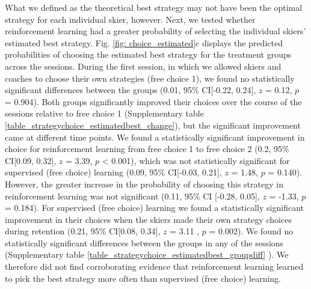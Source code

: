 \documentclass[pdflatex,sn-mathphys-num]{sn-jnl}%
\theoremstyle{thmstyleone}%
\theoremstyle{thmstyletwo}%
\theoremstyle{thmstylethree}%
\begin{document}
What we defined as the theoretical best strategy may not have been the optimal strategy for each individual skier, however. Next, we tested whether reinforcement learning had a greater probability of selecting the individual skiers' estimated best strategy.  Fig. \ref{fig: choice_estimated}c displays the predicted probabilities of choosing the estimated best strategy for the treatment groups across the sessions. During the first session, in which we allowed skiers and coaches to choose their own strategies (free choice 1),  we found no statistically significant differences between the groups (0.01, 95\% CI[-0.22, 0.24], $z$ = 0.12, $p$ = 0.904). Both groups significantly improved their choices over the course of the sessions relative to free choice 1 (Supplementary table \ref{table_strategychoice_estimatedbest_change}), but the significant improvement came at different time points. We found a statistically significant improvement in choice for reinforcement learning from free choice 1 to free choice 2 (0.2, 95\% CI[0.09, 0.32], $z$ = 3.39, $p$ < 0.001), which was not statistically significant for supervised (free choice) learning (0.09, 95\% CI[-0.03, 0.21], $z$ = 1.48, $p$ = 0.140). However, the greater increase in the probability of choosing this strategy in reinforcement learning was not significant (0.11, 95\% CI [-0.28, 0.05], $z$ = -1.33, $p$ = 0.184). For supervised (free choice) learning we found a statistically significant improvement in their choices when the skiers made their own strategy choices during retention (0.21, 95\% CI[0.08, 0.34], $z$ = 3.11 , $p$  =  0.002). We found no statistically significant differences between the groups in any of the sessions (Supplementary table \ref{table_strategychoice_estimatedbest_groupdiff} ). We therefore did not find corroborating evidence that reinforcement learning learned to pick the best strategy more often than supervised (free choice) learning. 
\end{document}
